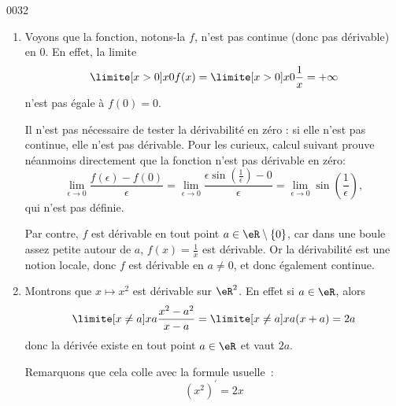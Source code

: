 \begin{corrige}{0032}
\begin{enumerate}
\item
Voyons que la fonction, notons-la $f$, n'est pas continue (donc pas dérivable) en $0$. En effet, la limite
\begin{equation*}
  \limite[x > 0] x 0 f(x) = \limite[x > 0] x 0 \frac 1 x = +\infty
\end{equation*}
n'est pas égale à $f(0) = 0$. 

Il n'est pas nécessaire de tester la dérivabilité en zéro : si elle n'est pas continue, elle n'est pas dérivable. Pour les curieux, calcul suivant prouve néanmoins directement que la fonction n'est pas dérivable en zéro:
\begin{equation}
		\lim_{\epsilon\to 0}\frac{ f(\epsilon)-f(0) }{ \epsilon }	=\lim_{\epsilon\to0}\frac{ \epsilon\sin(\frac{1}{ \epsilon })-0 }{ \epsilon }
			=	\lim_{\epsilon\to 0}\sin(\frac{1}{ \epsilon }),
\end{equation}
qui n'est pas définie.

Par contre, $f$ est dérivable en tout point $a \in \eR\setminus\{ 0 \}$, car dans
une boule assez petite autour de $a$, $f(x) = \frac 1 x$ est
dérivable. Or la dérivabilité est une notion locale, donc $f$ est
dérivable en $a \neq 0$, et donc également continue.

\item
Montrons que $x \mapsto x^2$ est dérivable
sur $\eR^2$. En effet si $a \in \eR$, alors
\begin{equation*}
  \limite[x\neq a] x a \frac{x^2 - a^2}{x-a} = \limite[x \neq a] x a (x
  + a) = 2 a
\end{equation*}
donc la dérivée existe en tout point $a \in \eR$ et vaut $2a$.

Remarquons que cela colle avec la formule usuelle~:
\begin{equation*}
  {(x^2)}^\prime = 2 x
\end{equation*}
\end{enumerate}


\end{corrige}
